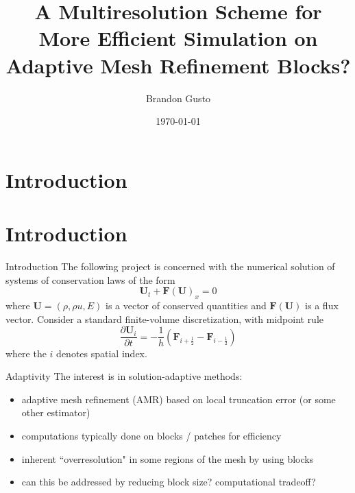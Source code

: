 \documentclass{beamer}
\begin{document}
\section{Introduction}
\title{A Multiresolution Scheme for More Efficient Simulation on Adaptive Mesh Refinement Blocks?}
\author{Brandon Gusto} %
\date{\today}
\frame{\titlepage}

\section{Introduction}

\begin{frame}{Introduction}
    The following project is concerned with the numerical solution of systems of conservation laws of the form
    \begin{equation*}
        \mathbf{U}_{t} + \mathbf{F}(\mathbf{U})_{x} = 0
    \end{equation*}
    where $\mathbf{U} = (\rho,\rho u,E)$ is a vector of conserved quantities and $\mathbf{F}(\mathbf{U})$ is a flux vector.
    Consider a standard finite-volume discretization, with midpoint rule
    \begin{equation*}
        \frac{\partial \mathbf{U}_{i}}{\partial t} = -\frac{1}{h} \left( \mathbf{F}_{i+\frac{1}{2}}
            - \mathbf{F}_{i-\frac{1}{2}} \right)
    \end{equation*}
    where the $i$ denotes spatial index.
\end{frame}

\begin{frame}{Adaptivity}
    The interest is in solution-adaptive methods:
    \begin{itemize}
        \item<2-> adaptive mesh refinement (AMR) based on local truncation error (or some other estimator)
        \item<3-> computations typically done on blocks / patches for efficiency
        \item<4-> inherent ``overresolution" in some regions of the mesh by using blocks
        \item<5-> can this be addressed by reducing block size? computational tradeoff?
    \end{itemize}
\end{frame}
\end{document}
